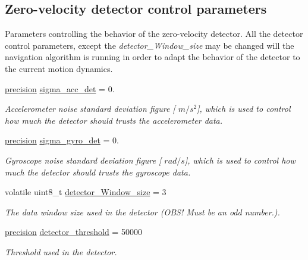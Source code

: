 \subsection*{\-Zero-\/velocity detector control parameters}
\label{_amgrp9b098e683e94baa665e2c2dccf093fdc}%
 \-Parameters controlling the behavior of the zero-\/velocity detector. \-All the detector control parameters, except the {\itshape detector\-\_\-\-Window\-\_\-size\/} may be changed will the navigation algorithm is running in order to adapt the behavior of the detector to the current motion dynamics. \begin{DoxyCompactItemize}
\item 
\hyperlink{nav__types_8h_a37e1884b1f06826c49607cec459b4e8a}{precision} \hyperlink{group__nav__eq_ga519e1c68258a371960249e09c24e9943}{sigma\-\_\-acc\-\_\-det} = 0.
\begin{DoxyCompactList}\small\item\em \-Accelerometer noise standard deviation figure \mbox{[} $m/s^2$\mbox{]}, which is used to control how much the detector should trusts the accelerometer data. \end{DoxyCompactList}\item 
\hyperlink{nav__types_8h_a37e1884b1f06826c49607cec459b4e8a}{precision} \hyperlink{group__nav__eq_ga779a972b079accc690d64bcd7bef3c91}{sigma\-\_\-gyro\-\_\-det} = 0.
\begin{DoxyCompactList}\small\item\em \-Gyroscope noise standard deviation figure \mbox{[} $rad/s$\mbox{]}, which is used to control how much the detector should trusts the gyroscope data. \end{DoxyCompactList}\item 
volatile uint8\-\_\-t \hyperlink{group__nav__eq_ga9e9b826ff87a8e0e4400661c27988682}{detector\-\_\-\-Window\-\_\-size} = 3
\begin{DoxyCompactList}\small\item\em \-The data window size used in the detector (\-O\-B\-S! \-Must be an odd number.). \end{DoxyCompactList}\item 
\hyperlink{nav__types_8h_a37e1884b1f06826c49607cec459b4e8a}{precision} \hyperlink{group__nav__eq_ga34d28cf12521d9706da4ddfca54106bf}{detector\-\_\-threshold} = 50000
\begin{DoxyCompactList}\small\item\em \-Threshold used in the detector. \end{DoxyCompactList}\item 

\end{DoxyCompactItemize}
